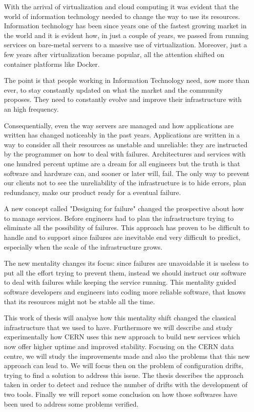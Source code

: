 
With the arrival of virtualization and cloud computing it was evident that
the world of information technology needed to change the way to use its
resources. Information technology has been since years one of the fastest
growing market in the world and it is evident how, in just a couple of
years, we passed from running services on bare-metal servers to a massive
use of virtualization. Moreover, just a few years after virtualization
became popular, all the attention shifted on container platforms like
Docker.

The point is that people working in Information Technology need, now more than
ever, to stay constantly updated on what the market and the community proposes. They need to constantly evolve and improve their infrastructure with an high
frequency.

Consequentially, even the way servers are managed and how applications are
written has changed noticeably in the past years. Applications are written
in a way to consider all their resources as unstable and unreliable: they
are instructed by the programmer on how to deal with failures.
Architectures and services with one hundred percent uptime are a dream for
all engineers but the truth is that software and hardware can, and sooner
or later will, fail. The only way to prevent our clients not to see the
unreliability of the infrastructure is to hide errors, plan redundancy,
make our product ready for a eventual failure.

A new concept called "Designing for failure" changed the prospective about
how to manage services. Before engineers had to plan the infrastructure
trying to eliminate all the possibility of failures. This approach has
proven to be difficult to handle and to support since failures are
inevitable end very difficult to predict, especially when the scale of the
infrastructure grows.

The new mentality changes its focus: since failures are unavoidable it is
useless to put all the effort trying to prevent them, instead we should
instruct our software to deal with failures while keeping the service
running. This mentality guided software developers and engineers into
coding more reliable software, that knows that its resources might not be
stable all the time.

This work of thesis will analyse how this mentality shift changed the
classical infrastructure that we used to have. Furthermore we will
describe and study experimentally how CERN uses this new approach to build
new services which now offer higher uptime and improved stability.
Focusing on the CERN data centre, we will study the improvements made and
also the problems that this new approach can lead to. We will focus then
on the problem of configuration drifts, trying to find a solution to
address this issue. The thesis describes the approach taken in order to
detect and reduce the number of drifts with the development of two tools.
Finally we will report some conclusion on how those softwares have been
used to address some problems verified.

